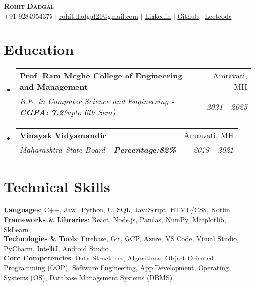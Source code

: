 \documentclass[letterpaper,11pt]{article}
\makeatletter
\newcommand{\resumeSubheading}[4]{
  \vspace{-2pt}\item
    \begin{tabular*}{0.97\textwidth}[t]{l@{\extracolsep{\fill}}r}
      \textbf{#1} & #2 \\
      \textit{\small#3} & \textit{\small #4} \\
    \end{tabular*}\vspace{-7pt}
}
\newcommand{\resumeSubHeadingListStart}{\begin{itemize}[leftmargin=0.15in, label={}]}
\newcommand{\resumeSubHeadingListEnd}{\end{itemize}}
\makeatother
\begin{document}
\begin{center}
    \textbf{\Huge \scshape Rohit Dadgal} \\ \vspace{1pt}
    \small +91-9284954375  $|$ \href{mailto:rohit.dadgal21@gmail.com}{\underline{rohit.dadgal21@gmail.com}} $|$ 
    \href{https://www.linkedin.com/in/rohitdadgal/}{\underline{Linkedin}} $|$
    \href{https://github.com/rohitd2103}{\underline{Github}} $|$
    \href{https://leetcode.com/u/Rohit2103/}{\underline{Leetcode}}
\end{center}

\section{Education}
  \resumeSubHeadingListStart
    \resumeSubheading
      {Prof. Ram Meghe College of Engineering and Management}{Amravati, MH}
      {B.E. in Computer Science and Engineering - \textbf{CGPA: 7.2}(upto 6th Sem)}{2021 - 2025}
    \resumeSubheading
      {Vinayak Vidyamandir}{Amravati, MH}
      {Maharashtra State Board - \textbf{Percentage:82\%} }{ 2019 - 2021}
  \resumeSubHeadingListEnd

\section{Technical Skills}
 \begin{itemize}[leftmargin=0.15in, label={}]
    \small{\item{
     \textbf{Languages}{: C++, Java, Python, C, SQL, JavaScript, HTML/CSS, Kotlin } \\
     \textbf{Frameworks \& Libraries}{: React, Node.js, Pandas, NumPy, Matplotlib, SkLearn  } \\
     \textbf{Technologies \& Tools}{: Firebase, Git, GCP, Azure, VS Code, Visual Studio, PyCharm, IntelliJ, Android Studio} \\
     \textbf{Core Competencies}{: Data Structures, Algorithms, Object-Oriented Programming (OOP), Software Engineering, App Development, Operating Systems (OS), Database Management Systems (DBMS)}
    }}
 \end{itemize}

\end{document}
